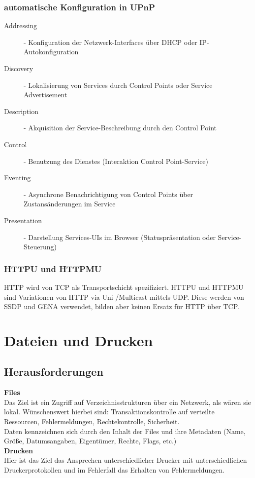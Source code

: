 \documentclass{article} %
\begin{document}
	\subsubsection{automatische Konfiguration in UPnP}
		\begin{description}
		\item[Addressing] - Konfiguration der Netzwerk-Interfaces über DHCP oder IP-Autokonfiguration
		\item[Discovery] - Lokalisierung von Services durch Control Points oder Service Advertisement 
		\item[Description] - Akquisition der Service-Beschreibung durch den Control Point 
		\item[Control] - Benutzung des Dienstes (Interaktion Control Point-Service)
		\item[Eventing] - Asynchrone Benachrichtigung von Control Points über Zustansänderungen im Service 
		\item[Presentation] - Darstellung Services-UIs im Browser (Statuspräsentation oder Service-Steuerung)
		\end{description}
	\subsubsection{HTTPU und HTTPMU}	
	 HTTP wird von TCP als Transportschicht spezifiziert. HTTPU und HTTPMU sind Variationen von HTTP via Uni-/Multicast mittels UDP. Diese werden von SSDP und GENA verwendet, bilden aber keinen Ersatz für HTTP über TCP.
	
	

\section{Dateien und Drucken}
\subsection{Herausforderungen}
\textbf{Files}\\
Das Ziel ist ein Zugriff auf Verzeichnisstrukturen über ein Netzwerk, als wären sie lokal. Wünschenswert hierbei sind: Transaktionskontrolle auf verteilte Ressourcen, Fehlermeldungen, Rechtekontrolle, Sicherheit. \\
Daten kennzeichnen sich durch den Inhalt der Files und ihre Metadaten (Name, Größe, Datumsangaben, Eigentümer, Rechte, Flags, etc.)\\


\noindent\textbf{Drucken}\\
Hier ist das Ziel das Ansprechen unterschiedlicher Drucker mit unterschiedlichen 
Druckerprotokollen und im Fehlerfall das Erhalten von Fehlermeldungen.\\
\end{document}
